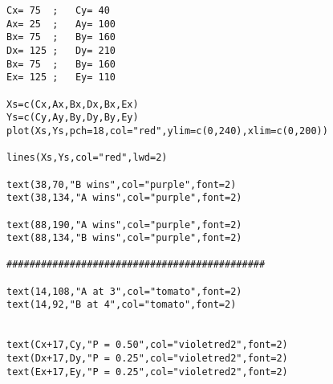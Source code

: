 
\begin{verbatim}
Cx=	75	;	Cy=	40
Ax=	25	;	Ay=	100
Bx=	75	;	By=	160
Dx=	125	;	Dy=	210
Bx=	75	;	By=	160
Ex=	125	;	Ey=	110

Xs=c(Cx,Ax,Bx,Dx,Bx,Ex)
Ys=c(Cy,Ay,By,Dy,By,Ey)
plot(Xs,Ys,pch=18,col="red",ylim=c(0,240),xlim=c(0,200))

lines(Xs,Ys,col="red",lwd=2)

text(38,70,"B wins",col="purple",font=2)
text(38,134,"A wins",col="purple",font=2)

text(88,190,"A wins",col="purple",font=2)
text(88,134,"B wins",col="purple",font=2)

#############################################

text(14,108,"A at 3",col="tomato",font=2)
text(14,92,"B at 4",col="tomato",font=2)


text(Cx+17,Cy,"P = 0.50",col="violetred2",font=2)
text(Dx+17,Dy,"P = 0.25",col="violetred2",font=2)
text(Ex+17,Ey,"P = 0.25",col="violetred2",font=2)
\end{verbatim}